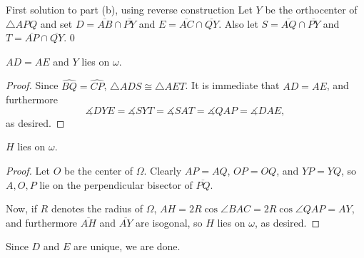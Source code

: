 \begin{customenv}{First solution to part (b), using reverse construction}
    Let $Y$ be the orthocenter of $\triangle APQ$ and set $D=\overline{AB}\cap\overline{PY}$ and $E=\overline{AC}\cap\overline{QY}$. Also let $S=\overline{AQ}\cap\overline{PY}$ and $T=\overline{AP}\cap\overline{QY}$.
    \setcounter{iclaim}0
    \begin{iclaim}
        $AD=AE$ and $Y$ lies on $\omega$.
    \end{iclaim}
    \begin{proof}
        Since $\widehat{BQ}=\widehat{CP}$, $\triangle ADS\cong\triangle AET$. It is immediate that $AD=AE$, and furthermore \[\measuredangle DYE=\measuredangle SYT=\measuredangle SAT=\measuredangle QAP=\measuredangle DAE,\]
        as desired.
    \end{proof}
    \begin{iclaim}
        $H$ lies on $\omega$.
    \end{iclaim}
    \begin{proof}
        Let $O$ be the center of $\Omega$. Clearly $AP=AQ$, $OP=OQ$, and $YP=YQ$, so $A,O,P$ lie on the perpendicular bisector of $\overline{PQ}$.

        Now, if $R$ denotes the radius of $\Omega$, $AH=2R\cos\angle BAC=2R\cos\angle QAP=AY$, and furthermore $\overline{AH}$ and $\overline{AY}$ are isogonal, so $H$ lies on $\omega$, as desired.
    \end{proof}

    Since $D$ and $E$ are unique, we are done. 
\end{customenv}
